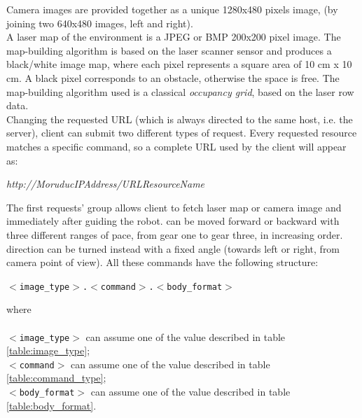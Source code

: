 Camera images are provided together as a unique 1280x480 pixels image, 
(by joining two 640x480 images, left and right).
\\
A laser map of the environment is a JPEG or BMP 200x200 pixel image. The map-building
algorithm is based on the laser scanner sensor and produces a black/white image
map, where each pixel represents a square area of 10 cm x 10 cm. A black pixel corresponds
to an obstacle, otherwise the space is free. The map-building algorithm used is a
classical \textit{occupancy grid}, based on the laser row data.
\\
Changing the requested URL (which is always directed to the same host,
i.e. the \morduc{} server), client can submit two different types of request.
Every requested resource matches a specific command, so a complete URL used
by the client will appear as:

\begin{center}
  \textit{http://MoruducIPAddress/URLResourceName}
\end{center}

The first requests' group allows client to fetch laser map or camera image and
immediately after guiding the robot. \morduc{} can be moved
forward or backward with three different ranges of pace, from gear one to
gear three, in increasing order.
\morduc{} direction can be turned instead
with a fixed angle (towards left or right, from camera point
of view). All these commands have the following structure:

\begin{center}
  \texttt{$<$image\_type$>$.$<$command$>$.$<$body\_format$>$}
\end{center}

where \\ \\
\texttt{$<$image\_type$>$} can assume one of the value described in table
\ref{table:image_type};\\
\texttt{$<$command$>$} can assume one of the value described in table
\ref{table:command_type};\\
\texttt{$<$body\_format$>$} can assume one of the value described in table
\ref{table:body_format}. \\

